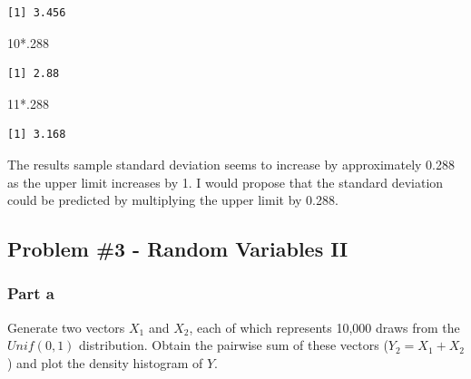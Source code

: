 \documentclass[
  letterpaper,
  DIV=11,
  numbers=noendperiod]{scrartcl}
\newenvironment{Shaded}{\begin{snugshade}}{\end{snugshade}}
\newcommand{\DecValTok}[1]{\textcolor[rgb]{0.68,0.00,0.00}{#1}}
\newcommand{\NormalTok}[1]{\textcolor[rgb]{0.00,0.23,0.31}{#1}}
\newcommand{\SpecialCharTok}[1]{\textcolor[rgb]{0.37,0.37,0.37}{#1}}
\begin{document}
\begin{verbatim}
[1] 3.456
\end{verbatim}

\begin{Shaded}
\begin{Highlighting}[]
\DecValTok{10}\SpecialCharTok{*}\NormalTok{.}\DecValTok{288}
\end{Highlighting}
\end{Shaded}

\begin{verbatim}
[1] 2.88
\end{verbatim}

\begin{Shaded}
\begin{Highlighting}[]
\DecValTok{11}\SpecialCharTok{*}\NormalTok{.}\DecValTok{288}
\end{Highlighting}
\end{Shaded}

\begin{verbatim}
[1] 3.168
\end{verbatim}

The results sample standard deviation seems to increase by approximately
0.288 as the upper limit increases by 1. I would propose that the
standard deviation could be predicted by multiplying the upper limit by
0.288.

\hypertarget{problem-3---random-variables-ii}{%
\subsection{Problem \#3 - Random Variables
II}\label{problem-3---random-variables-ii}}

\hypertarget{part-a-2}{%
\subsubsection{Part a}\label{part-a-2}}

Generate two vectors \(X_{1}\) and \(X_{2}\), each of which represents
10,000 draws from the \(Unif(0,1)\) distribution. Obtain the pairwise
sum of these vectors (\(Y_{2} = X_{1} + X_{2}\)) and plot the density
histogram of \(Y\).
\end{document}
